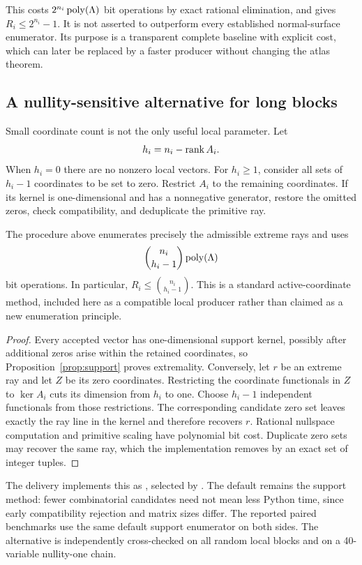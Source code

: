 This costs $2^{n_i}\operatorname{poly}(\Lambda)$ bit operations by exact rational elimination, and gives $R_i\le2^{n_i}-1$. It is not asserted to outperform every established normal-surface enumerator. Its purpose is a transparent complete baseline with explicit cost, which can later be replaced by a faster producer without changing the atlas theorem.

\subsection{A nullity-sensitive alternative for long blocks}
Small coordinate count is not the only useful local parameter. Let
\[
 h_i=n_i-\operatorname{rank} A_i.
\]
When $h_i=0$ there are no nonzero local vectors. For $h_i\ge1$, consider all sets of $h_i-1$ coordinates to be set to zero. Restrict $A_i$ to the remaining coordinates. If its kernel is one-dimensional and has a nonnegative generator, restore the omitted zeros, check compatibility, and deduplicate the primitive ray.

\begin{proposition}
\label{prop:zeros}
The procedure above enumerates precisely the admissible extreme rays and uses
\[
 \binom{n_i}{h_i-1}\operatorname{poly}(\Lambda)
\]
bit operations. In particular, $R_i\le\binom{n_i}{h_i-1}$. This is a standard active-coordinate method, included here as a compatible local producer rather than claimed as a new enumeration principle.
\end{proposition}
\begin{proof}
Every accepted vector has one-dimensional support kernel, possibly after additional zeros arise within the retained coordinates, so Proposition~\ref{prop:support} proves extremality. Conversely, let $r$ be an extreme ray and let $Z$ be its zero coordinates. Restricting the coordinate functionals in $Z$ to $\ker A_i$ cuts its dimension from $h_i$ to one. Choose $h_i-1$ independent functionals from those restrictions. The corresponding candidate zero set leaves exactly the ray line in the kernel and therefore recovers $r$. Rational nullspace computation and primitive scaling have polynomial bit cost. Duplicate zero sets may recover the same ray, which the implementation removes by an exact set of integer tuples.
\end{proof}

The delivery implements this as , selected by . The default remains the support method: fewer combinatorial candidates need not mean less Python time, since early compatibility rejection and matrix sizes differ. The reported paired benchmarks use the same default support enumerator on both sides. The alternative is independently cross-checked on all random local blocks and on a 40-variable nullity-one chain.

